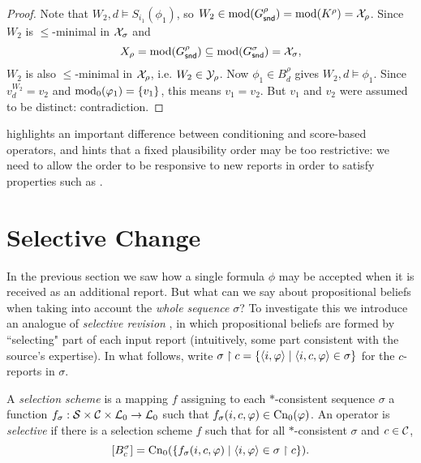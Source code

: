 \begin{proof}
    Note that $W_2, d \models S_{i_1}(\phi_1)$, so $W_2 \in \operatorname{mod}(G^\rho_{\mathsf{snd}})
    = \operatorname{mod}(K^\rho) = \mathcal{X}_\rho$. Since $W_2$ is $\le$-minimal in $\mathcal{X}_\sigma$ and
    \[
        X_\rho = \operatorname{mod}(G^\rho_{\mathsf{snd}}) \subseteq \operatorname{mod}(G^\sigma_{\mathsf{snd}}) = \mathcal{X}_\sigma,
    \]
    $W_2$ is also $\le$-minimal in $\mathcal{X}_\rho$, i.e. $W_2 \in \mathcal{Y}_\rho$. Now
    $\phi_1 \in B^\rho_d$ gives $W_2, d \models \phi_1$. Since $v^{W_2}_d =
    v_2$ and $\operatorname{mod}_0(\varphi_1) = \{v_1\}$, this means $v_1 = v_2$. But $v_1$
    and $v_2$ were assumed to be distinct: contradiction.

\end{proof}

 highlights an important
difference between conditioning and score-based operators, and hints that
a fixed plausibility order may be too restrictive: we
need to allow the order to be responsive to new reports in order to satisfy
properties such as \strongcondsucc{}.

\section{Selective Change}
\label{sec:selective_change}

In the previous section we saw how a single formula $\phi$ may be accepted when
it is received as an additional report. But what can we say about propositional
beliefs when taking into account the \emph{whole sequence} $\sigma$? To
investigate this we introduce an analogue of \emph{selective revision}
\cite{ferme1999selective}, in which propositional beliefs are
formed by ``selecting" part of each input report (intuitively, some part
consistent with the source's expertise). In what follows, write $\sigma \upharpoonright c =
\{\langle {i, \varphi} \rangle \mid \langle {i, c, \varphi} \rangle \in \sigma\}$ for the $c$-reports in
$\sigma$.

\begin{definition}
    \label{def:selectivity}
    A \emph{selection scheme} is a mapping $f$ assigning to each
    $\ast$-consistent sequence $\sigma$ a function $f_\sigma: \mathcal{S} \times \mathcal{C}
    \times \mathcal{L}{}_0 \to \mathcal{L}{}_0$ such that $f_\sigma(i, c, \varphi) \in
    \operatorname{Cn}_0(\varphi)$.
    An operator is \emph{selective} if there is a selection scheme $f$ such
    that for all $\ast$-consistent $\sigma$ and $c \in \mathcal{C}$,
    \[
        \left[{B^\sigma_c}\right] = \operatorname{Cn}_0(\{f_\sigma(i, c, \varphi) \mid \langle {i,
        \varphi} \rangle \in \sigma \upharpoonright c\}).
    \]
\end{definition}

